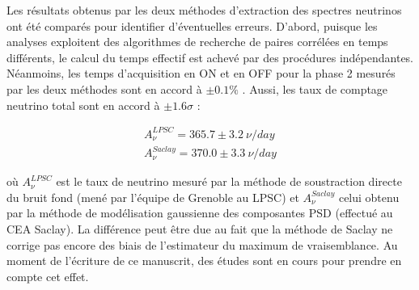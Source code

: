 Les résultats obtenus par les deux méthodes d'extraction des spectres neutrinos ont été comparés pour identifier d'éventuelles erreurs. D'abord, puisque les analyses exploitent des algorithmes de recherche de paires corrélées en temps différents, le calcul du temps effectif est achevé par des procédures indépendantes. Néanmoins, les temps d'acquisition en ON et en OFF pour la phase 2 mesurés par les deux méthodes sont en accord à $\pm 0.1 \%$ \cite{docdb936}. Aussi, les taux de comptage neutrino total sont en accord à $\pm 1.6\sigma$ :

\begin{align}
    A_\nu^{LPSC} = 365.7 \pm 3.2 \SI{}{\nu/day}\\
    A_\nu^{Saclay} = 370.0 \pm 3.3 \SI{}{\nu/day}
\end{align}

\bigbreak

où $A_\nu^{LPSC}$ est le taux de neutrino mesuré par la méthode de soustraction directe du bruit fond (mené par l'équipe de Grenoble au LPSC) et $A_\nu^{Saclay}$ celui obtenu par la méthode de modélisation gaussienne des composantes PSD (effectué au CEA Saclay). La différence peut être due au fait que la méthode de Saclay ne corrige pas encore des biais de l'estimateur du maximum de vraisemblance. Au moment de l'écriture de ce manuscrit, des études sont en cours pour prendre en compte cet effet.\\

\bigbreak




